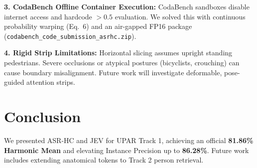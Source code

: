 \documentclass[10pt,twocolumn,letterpaper]{article}
\begin{document}
\textbf{3. CodaBench Offline Container Execution:} CodaBench sandboxes disable internet access and hardcode $>0.5$ evaluation. We solved this with continuous probability warping (Eq.~6) and an air-gapped FP16 package (\texttt{codabench\_code\_submission\_asrhc.zip}).

\textbf{4. Rigid Strip Limitations:} Horizontal slicing assumes upright standing pedestrians. Severe occlusions or atypical postures (bicyclists, crouching) can cause boundary misalignment. Future work will investigate deformable, pose-guided attention strips.

\section{Conclusion}
\label{sec:conclusion}
We presented ASR-HC and JEV for UPAR Track 1, achieving an official \textbf{81.86\% Harmonic Mean} and elevating Instance Precision up to \textbf{86.28\%}. Future work includes extending anatomical tokens to Track 2 person retrieval.

{\small


}
\end{document}
